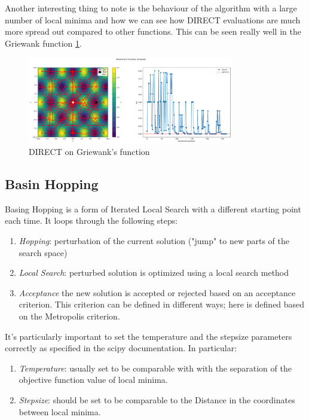 Another interesting thing to note is the behaviour of the algorithm with a large number of local minima and how we can see how DIRECT evaluations are much more spread out compared to other functions. This can be seen really well in the Griewank function \ref{fig:griewank}.
\begin{figure}[H]
    \centering
    \includegraphics[width=0.8\textwidth]{lab2/imgs/griewank.png}
    \caption{DIRECT on Griewank's function}
    \label{fig:griewank}
\end{figure}

\subsection{Basin Hopping}
Basing Hopping is a form of Iterated Local Search with a different starting point each time. It loops through the following steps:
\begin{enumerate}
    \item \textit{Hopping}: perturbation of the current solution ("jump" to new parts of the search space)
    \item \textit{Local Search}: perturbed solution is optimized using a local search method
    \item \textit{Acceptance} the new solution is accepted or rejected based on an acceptance criterion. This criterion can be defined in different ways; here is defined based on the Metropolis criterion.
\end{enumerate}
It's particularly important to set the temperature and the stepsize parameters correctly as specified in the scipy documentation. In particular:
\begin{enumerate}
    \item \textit{Temperature}: usually set to be comparable with with the separation of the objective function value of local minima.
    \item \textit{Stepsize}: should be set to be comparable to the Distance in the coordinates between local minima.
\end{enumerate}

